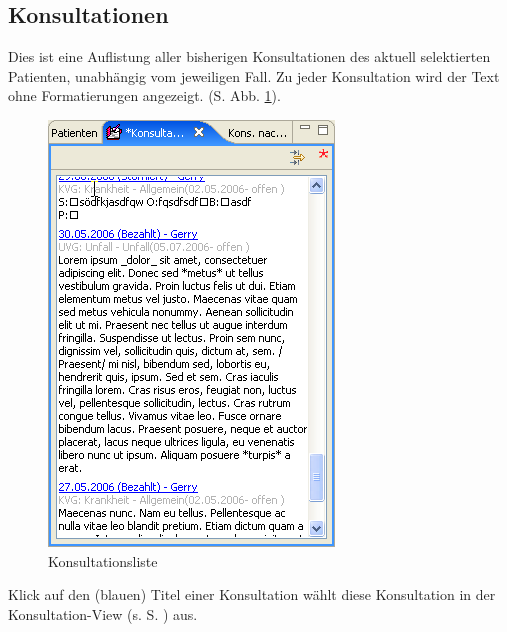 \bigskip

\subsection{Konsultationen}
\label{view:konsultationen}
Dies ist eine Auflistung aller bisherigen Konsultationen des aktuell
selektierten Patienten, unabhängig vom jeweiligen Fall.
 Zu jeder Konsultation
wird der Text ohne Formatierungen angezeigt. (S. Abb. \ref{fig:konslisteview}).\\
\begin{figure}
  \includegraphics{images/konslisteview}
  \caption{Konsultationsliste}
  \label{fig:konslisteview}
\end{figure}
Klick auf den (blauen) Titel einer Konsultation wählt diese Konsultation in der
Konsultation-View (s. S. \pageref{konsview}) aus.

